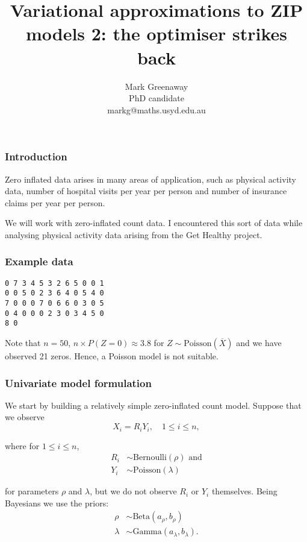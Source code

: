 \documentclass{beamer}
\title{Variational approximations to ZIP models 2: the optimiser strikes back}
\author{Mark Greenaway\\PhD candidate\\markg@maths.usyd.edu.au}
\begin{document}
\begin{frame}
\titlepage
\end{frame}

\begin{frame}
\frametitle{Introduction}
Zero inflated data arises in many areas of application, such as physical
activity data, number of hospital visits per year per person and
number of insurance claims per year per person.

\bigskip 
We will work with zero-inflated count data. I encountered this sort of data 
while analysing physical activity data arising from the Get Healthy project.
\end{frame}

\begin{frame}[fragile]
\frametitle{Example data}
\begin{verbatim}
0 7 3 4 5 3 2 6 5 0 0 1
0 0 5 0 2 3 6 4 0 5 4 0
7 0 0 0 7 0 6 6 0 3 0 5
0 4 0 0 0 2 3 0 3 4 5 0
8 0
\end{verbatim}

\noindent Note that $n=50$, 
$n\times P(Z = 0) \approx 3.8$ for $Z\sim\mbox{Poisson}(\overline{X})$
and we have observed 21 zeros. Hence,
a Poisson model is not suitable.

\end{frame}

\begin{frame}
\frametitle{Univariate model formulation}

We start by building a relatively simple zero-inflated count model. Suppose that we observe
$$
X_i = R_i Y_i, \quad 1\le i\le n,
$$

\noindent where for $1\le i\le n$,
\begin{align*} 
R_i &\sim \text{Bernoulli}(\rho) \text{ and}\\
Y_i &\sim \text{Poisson}(\lambda)
\end{align*}

\noindent for parameters $\rho$ and $\lambda$,
but we do not observe $R_i$ or $Y_i$ themselves.
Being Bayesians we use the priors:
\begin{align*} 
\rho &\sim \text{Beta}(a_\rho, b_\rho) \\
\lambda &\sim \text{Gamma}(a_\lambda, b_\lambda).
\end{align*}

\end{frame}
\end{document}
